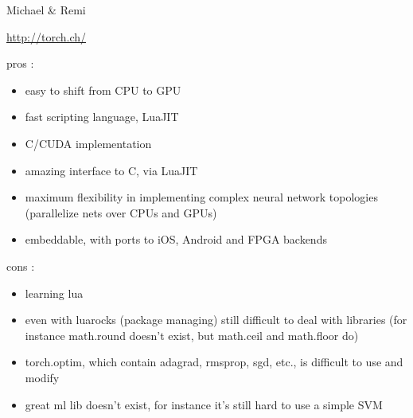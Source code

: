 {\color{red}Michael \& Remi}

\url{http://torch.ch/}

pros :
\begin{itemize}
 \item easy to shift from CPU to GPU
 \item fast scripting language, LuaJIT
 \item C/CUDA implementation
 \item amazing interface to C, via LuaJIT
 \item maximum flexibility in implementing complex neural network topologies (parallelize nets over CPUs and GPUs)
 \item embeddable, with ports to iOS, Android and FPGA backends
\end{itemize}

cons : 
\begin{itemize}
  \item learning lua 
  \item even with luarocks (package managing) still difficult to deal with libraries (for instance math.round doesn't exist, but math.ceil and math.floor do)
  \item torch.optim, which contain adagrad, rmsprop, sgd, etc., is difficult to use and modify
  \item great ml lib doesn't exist, for instance it's still hard to use a simple SVM
\end{itemize}

